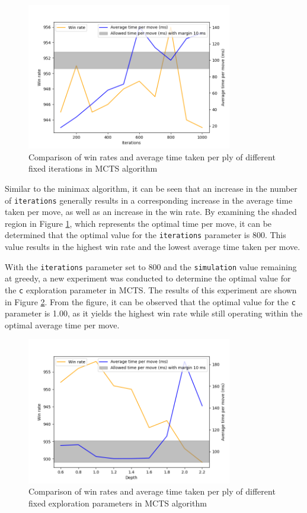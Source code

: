 \begin{figure}[h]
  \centering
  \captionsetup{justification=centering}
  \includegraphics[width=0.8\textwidth]{../img/mcts_iterations_openworld.png}
  \caption{Comparison of win rates and average time taken per ply of different fixed iterations in MCTS algorithm}
  \label{mctsOWIterations}
\end{figure}

Similar to the minimax algorithm, it can be seen that an increase in the number of \texttt{iterations} generally results in a corresponding increase in the average time taken per move, as well as an increase in the win rate. By examining the shaded region in Figure \ref{mctsOWIterations}, which represents the optimal time per move, it can be determined that the optimal value for the \texttt{iterations} parameter is 800. This value results in the highest win rate and the lowest average time taken per move.

With the \texttt{iterations} parameter set to 800 and the \texttt{simulation} value remaining at greedy, a new experiment was conducted to determine the optimal value for the \texttt{c} exploration parameter in MCTS. The results of this experiment are shown in Figure \ref{mctsOWC}. From the figure, it can be observed that the optimal value for the \texttt{c} parameter is 1.00, as it yields the highest win rate while still operating within the optimal average time per move.

\begin{figure}[h]
  \centering
  \captionsetup{justification=centering}
  \includegraphics[width=0.8\textwidth]{../img/mcts_c_openworld.png}
  \caption{Comparison of win rates and average time taken per ply of different fixed exploration parameters in MCTS algorithm}
  \label{mctsOWC}
\end{figure}


